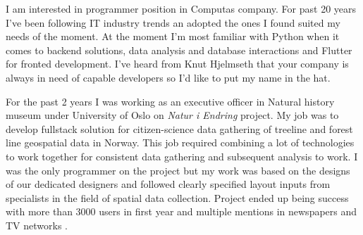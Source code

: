 

  I am interested in programmer position in Computas company. For past 20 years I've been following IT industry trends an adopted the ones I found suited my needs of the moment. At the moment I'm most familiar with Python when it comes to backend solutions, data analysis and database interactions and Flutter for fronted development. I've heard from Knut Hjelmseth that your company is always in need of capable developers so I'd like to put my name in the hat. 
  \par
  For the past 2 years I was working as an executive officer in  Natural history museum under University of Oslo on \textit{Natur i Endring} project. My job was to develop fullstack solution for citizen-science data gathering of treeline and forest line geospatial data in Norway. This job required combining a lot of technologies to work together for consistent data gathering and subsequent analysis to work. I was the only programmer on the project but my work was based on the designs of our dedicated designers and followed clearly specified layout inputs from specialists in the field of spatial data collection. Project ended up being success with more than 3000 users in first year and multiple mentions in newspapers and TV networks \cite{newspaper1,newspaper2,newspaper3,newspaper4,newspaper5,tv1,tv2}. 

